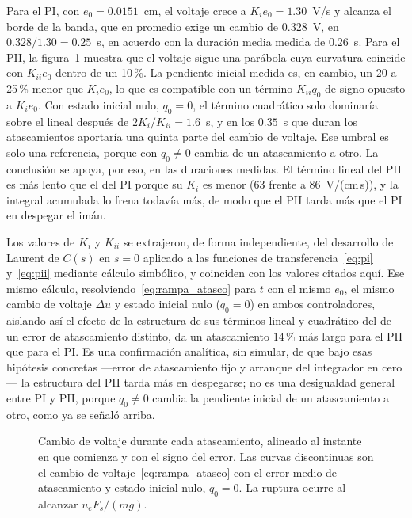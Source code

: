Para el PI, con $e_0=0.0151$~cm, el voltaje crece a $K_i e_0 = 1.30$~V/s y alcanza el borde de la banda, que en promedio exige un cambio de $0.328$~V, en $0.328/1.30=0.25$~s, en acuerdo con la duración media medida de $0.26$~s. Para el PII, la figura~\ref{fig:atasco} muestra que el voltaje sigue una parábola cuya curvatura coincide con $K_{ii}e_0$ dentro de un 10\,\%. La pendiente inicial medida es, en cambio, un 20 a 25\,\% menor que $K_i e_0$, lo que es compatible con un término $K_{ii}q_0$ de signo opuesto a $K_i e_0$. Con estado inicial nulo, $q_0=0$, el término cuadrático solo dominaría sobre el lineal después de $2K_i/K_{ii}=1.6$~s, y en los $0.35$~s que duran los atascamientos aportaría una quinta parte del cambio de voltaje. Ese umbral es solo una referencia, porque con $q_0\neq0$ cambia de un atascamiento a otro. La conclusión se apoya, por eso, en las duraciones medidas. El término lineal del PII es más lento que el del PI porque su $K_i$ es menor (63 frente a 86~V/(cm\,s)), y la integral acumulada lo frena todavía más, de modo que el PII tarda más que el PI en despegar el imán.

Los valores de $K_i$ y $K_{ii}$ se extrajeron, de forma independiente, del desarrollo de Laurent de $C(s)$ en $s=0$ aplicado a las funciones de transferencia~\eqref{eq:pi} y~\eqref{eq:pii} mediante cálculo simbólico, y coinciden con los valores citados aquí. Ese mismo cálculo, resolviendo~\eqref{eq:rampa_atasco} para $t$ con el mismo $e_0$, el mismo cambio de voltaje $\Delta u$ y estado inicial nulo ($q_0=0$) en ambos controladores, aislando así el efecto de la estructura de sus términos lineal y cuadrático del de un error de atascamiento distinto, da un atascamiento $14$\,\% más largo para el PII que para el PI. Es una confirmación analítica, sin simular, de que bajo esas hipótesis concretas —error de atascamiento fijo y arranque del integrador en cero— la estructura del PII tarda más en despegarse; no es una desigualdad general entre PI y PII, porque $q_0\neq0$ cambia la pendiente inicial de un atascamiento a otro, como ya se señaló arriba.

\begin{figure}[ht]
    \centering
    
    \caption[Voltaje durante el atascamiento]{Cambio de voltaje durante cada atascamiento, alineado al instante en que comienza y con el signo del error. Las curvas discontinuas son el cambio de voltaje~\eqref{eq:rampa_atasco} con el error medio de atascamiento y estado inicial nulo, $q_0=0$. La ruptura ocurre al alcanzar $u_eF_s/(mg)$.}
    \label{fig:atasco}
\end{figure}


